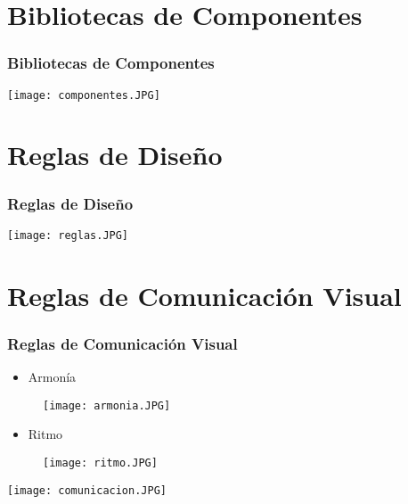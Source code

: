 \documentclass[11pt]{beamer}
\begin{document}
\section{Bibliotecas de Componentes}
\begin{frame}
\frametitle{Bibliotecas de Componentes}
\texttt{[image: componentes.JPG]} 
\newline \newline
\end{frame}

\section{Reglas de Diseño}
\begin{frame}
\frametitle{Reglas de Diseño}
\texttt{[image: reglas.JPG]} 
\newline \newline
\end{frame}

\section{Reglas de Comunicación Visual}
\begin{frame}
\frametitle{Reglas de Comunicación Visual}
\begin{minipage}[c]{6cm} 
\begin{itemize}
\item Armonía
\end{itemize}
\begin{figure}[posición]
  \centering
  \texttt{[image: armonia.JPG]} 
\end{figure}
\end{minipage}
\begin{minipage}[c]{5.5cm} 
\begin{itemize}
\item Ritmo
\end{itemize}
\begin{figure}[posición]
  \centering
  \texttt{[image: ritmo.JPG]} 
\end{figure}
\end{minipage} 
\end{frame}


\begin{frame}
\texttt{[image: comunicacion.JPG]} 
\end{frame}
\end{document}
